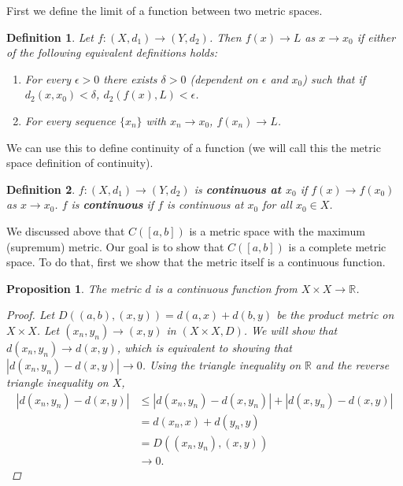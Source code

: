 \documentclass[12pt]{amsart}         %
\newtheorem{definition}{Definition}[section]
\newtheorem{proposition}{Proposition}[section]
\theoremstyle{remark}
\newcommand{\R}{\mathbb{R}}
\begin{document}
First we define the limit of a function between two metric spaces. 

\begin{definition}Let $f: (X, d_1) \rightarrow (Y, d_2)$. Then $f(x) \rightarrow L$ as $x \rightarrow x_0$ if either of the following equivalent definitions holds:
\begin{enumerate}
\item For every $\epsilon > 0$ there exists $\delta > 0$ (dependent on $\epsilon$ and $x_0$) such that if $d_2(x, x_0) < \delta$, $d_2(f(x), L) < \epsilon$.
\item For every sequence $\{x_n\}$ with $x_n \rightarrow x_0$, $f(x_n) \rightarrow L$.
\end{enumerate}
\end{definition}

We can use this to define continuity of a function (we will call this the metric space definition of continuity).

\begin{definition}
$f : (X, d_1) \rightarrow (Y, d_2)$ is \textbf{continuous at $x_0$} if $f(x) \rightarrow f(x_0)$ as $x \rightarrow x_0$. $f$ is \textbf{continuous} if $f$ is continuous at $x_0$ for all $x_0 \in X$.
\end{definition}

We discussed above that $C([a,b])$ is a metric space with the maximum (supremum) metric. Our goal is to show that $C([a,b])$ is a complete metric space. To do that, first we show that the metric itself is a continuous function.

\begin{proposition}
The metric $d$ is a continuous function from $X \times X \rightarrow \R$.
\begin{proof}
Let $D\left((a,b),(x,y)\right) = d(a,x)+d(b,y)$ be the product metric on $X \times X$. Let $(x_n, y_n) \rightarrow (x, y)$ in $(X \times X, D)$. We will show that $d(x_n,y_n) \rightarrow d(x,y)$, which is equivalent to showing that $|d(x_n, y_n) - d(x,y)| \rightarrow 0$. Using the triangle inequality on $\R$ and the reverse triangle inequality on $X$,
\begin{align*}
    |d(x_n, y_n) - d(x,y)| &\leq |d(x_n, y_n) - d(x, y_n)| + |d(x, y_n) - d(x,y)| \\
    &= d(x_n, x) + d(y_n, y) \\
    &= D((x_n, y_n), (x, y)) \\
    &\rightarrow 0.
\end{align*}
\end{proof}
\end{proposition}
\end{document}
